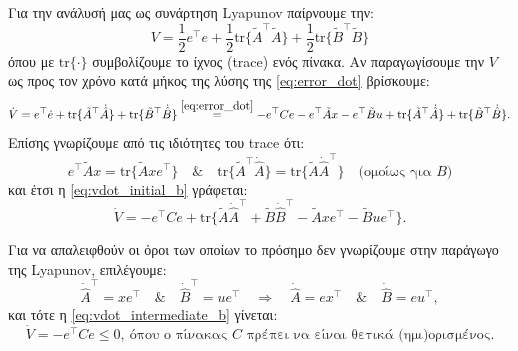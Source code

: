 \documentclass[12pt]{article} %
\numberwithin{equation}{section}  %
\begin{document}
\noindent\textbullet\hspace{0.2em} Για την ανάλυσή μας ως συνάρτηση Lyapunov παίρνουμε την:
\begin{equation}\label{eq:lyapunov_b}
V = \frac{1}{2}e^{\top} e + \frac{1}{2}\text{tr}\{\tilde{A}^{\top}\tilde{A}\} + \frac{1}{2}\text{tr}\{\tilde{B}^{\top}\tilde{B}\}
\end{equation}
όπου με $\text{tr}\{\cdot\}$ συμβολίζουμε το ίχνος (trace) ενός πίνακα. Αν παραγωγίσουμε την $V$ ως προς τον χρόνο κατά μήκος της λύσης της \eqref{eq:error_dot} βρίσκουμε:
\begin{equation}\label{eq:vdot_initial_b}
\dot{V} = e^{\top} \dot{e} + \text{tr}\{\tilde{A}^{\top}\dot{\hat{A}}\} + \text{tr}\{\tilde{B}^{\top}\dot{\hat{B}}\} \overset{\eqref{eq:error_dot}}{=}
- e^{\top} C e - e^{\top} \tilde{A} x - e^{\top} \tilde{B}u + \text{tr}\{\tilde{A}^{\top}\dot{\hat{A}}\} + \text{tr}\{\tilde{B}^{\top}\dot{\hat{B}}\}.
\end{equation}
Επίσης γνωρίζουμε από τις ιδιότητες του trace ότι:
\begin{equation*}
e^{\top} \tilde{A} x = \text{tr}\{\tilde{A} x e^{\top}\} \quad\& \quad
\text{tr}\{\tilde{A}^{\top}\dot{\hat{A}}\} = \text{tr}\{\tilde{A}\dot{\hat{A}}^{\top}\}
\quad \text{(ομοίως για $B$)}
\end{equation*}
και έτσι η \eqref{eq:vdot_initial_b} γράφεται:
\begin{equation}\label{eq:vdot_intermediate_b}
\dot{V} = - e^{\top} C e + \text{tr}\{\tilde{A}\dot{\hat{A}}^{\top} + \tilde{B}\dot{\hat{B}}^{\top} - \tilde{A} x e^{\top} - \tilde{B}u e^{\top}\}.
\end{equation}



\vspace{+8pt}

\noindent\textbullet\hspace{0.2em} Για να απαλειφθούν οι όροι των οποίων το πρόσημο δεν γνωρίζουμε στην παράγωγο της Lyapunov, επιλέγουμε:
\begin{equation}\label{eq:adapt_A_B}
\dot{\hat{A}}^{\top} = x e^{\top} \quad \& \quad
\dot{\hat{B}}^{\top} = u e^{\top} \quad \Rightarrow \quad
\dot{\hat{A}} = e x^{\top} \quad \& \quad
\dot{\hat{B}} = e u^{\top},
\end{equation}
και τότε η \eqref{eq:vdot_intermediate_b} γίνεται:
\begin{equation}\label{eq:vdot_final_b}
\dot{V} = - e^{\top} C e \leq 0, \ \text{όπου ο πίνακας $C$ πρέπει να είναι θετικά (ημι)ορισμένος.}
\end{equation}
\end{document}

